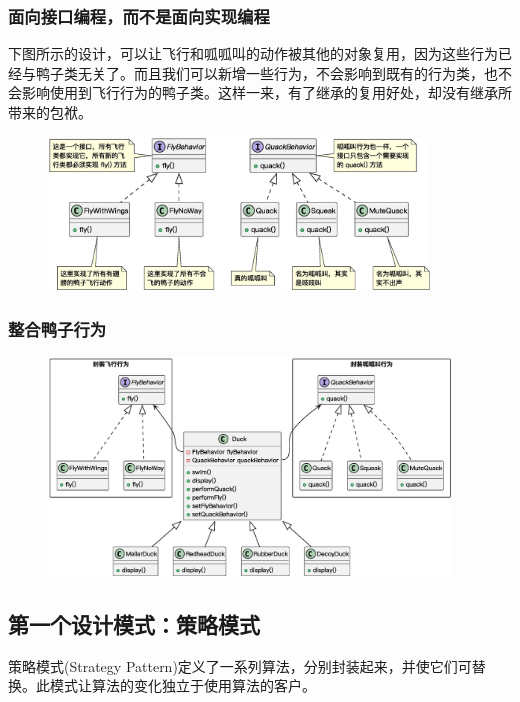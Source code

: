 \subsubsection{面向接口编程，而不是面向实现编程}
下图所示的设计，可以让飞行和呱呱叫的动作被其他的对象复用，因为这些行为已经与鸭子类无关了。而且我们可以新增一些行为，不会影响到既有的行为类，也不会影响使用到飞行行为的鸭子类。这样一来，有了继承的复用好处，却没有继承所带来的包袱。
\begin{figure}[H]
    \vspace{-0.5em}
	\centering
	\includegraphics[width=0.9\textwidth]{images/SimUDuck5.eps}
    \vspace{-1em}
\end{figure}

\subsubsection{整合鸭子行为}
\begin{figure}[H]
    \vspace{-0.5em}
	\centering
	\includegraphics[width=0.95\textwidth]{images/SimUDuck6.eps}
    \vspace{-1em}
\end{figure}


\subsection{第一个设计模式：策略模式}
策略模式(Strategy Pattern)定义了一系列算法，分别封装起来，并使它们可替换。此模式让算法的变化独立于使用算法的客户。

